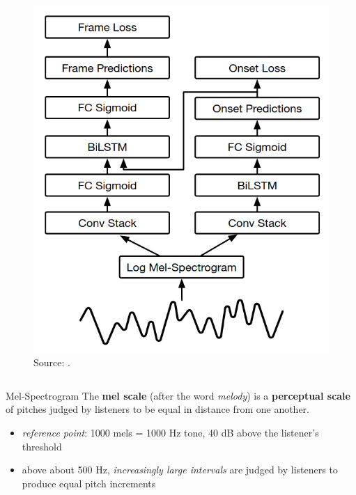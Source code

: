 \documentclass{beamer}
\newcommand{\emp}[1]{\textcolor{tum}{\textbf{#1}}}
\begin{document}
\begin{frame}[allowframebreaks]
\begin{columns}
		\begin{column}{0.6\textwidth}
			\begin{figure}[!ht]
				\centering
				\includegraphics[width=.7\textwidth]{OF.png}
				\caption{Source: \cite{OF}.}
				\label{fig:OF}
			\end{figure}
		\end{column}
	\end{columns}




	\framebreak

	\begin{block}{Mel-Spectrogram}
		The \emp{mel scale} (after the word \textit{melody})
		is a \textbf{perceptual scale} of pitches judged by listeners to be equal in distance from one another.

		\begin{itemize}
			\item \textit{reference point}: 1000 mels = 1000 Hz tone, 40 dB above the listener's threshold
			\item above about 500 Hz, \textit{increasingly large intervals} are judged by listeners to produce equal pitch increments
		\end{itemize}



	\end{block}



\end{frame}
\end{document}
